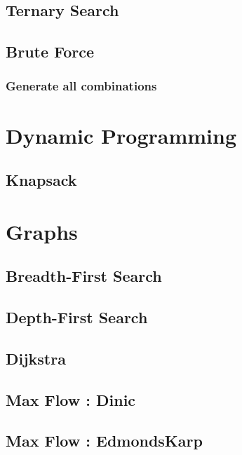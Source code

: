 \documentclass[10pt,landscape,twocolumn,a4paper,notitlepage]{article}
\begin{document}
  \subsection{Ternary Search}
  

  \subsection{Brute Force}
    \subsubsection{Generate all combinations}
    

\section{Dynamic Programming}
  \subsection{Knapsack}
  

\section{Graphs}
  \subsection{Breadth-First Search}
  

  \subsection{Depth-First Search}
  

  \subsection{Dijkstra}
  

  \subsection{Max Flow : Dinic}
  

  \subsection{Max Flow : EdmondsKarp}
  
\end{document}
